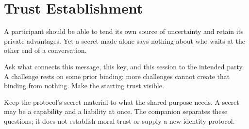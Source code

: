 \chapter{Trust Establishment}
\label{short:trust-establishment}

A participant should be able to tend its own source of uncertainty and retain
its private advantages. Yet a secret made alone says nothing about who waits
at the other end of a conversation.

Ask what connects this message, this key, and this session to the intended
party. A challenge rests on some prior binding; more challenges cannot
create that binding from nothing. Make the starting trust visible.

Keep the protocol's secret material to what the shared purpose needs. A secret may be a capability
and a liability at once. The companion separates these questions; it does
not establish moral trust or supply a new identity protocol.

